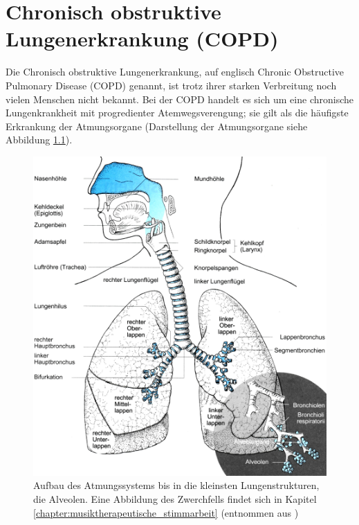\ifpdf
\graphicspath{{2_chronisch_obstruktive_lungenerkrankung/figures/PNG/}{2_chronisch_obstruktive_lungenerkrankung/figures/PDF/}{2_chronisch_obstruktive_lungenerkrankung/figures/}}
\else
\graphicspath{{2_chronisch_obstruktive_lungenerkrankung/figures/EPS/}{2_chronisch_obstruktive_lungenerkrankung/figures/}}
\fi

\chapter{Chronisch obstruktive Lungenerkrankung (COPD)}
\label{chapter:copd}

Die Chronisch obstruktive Lungenerkrankung, auf englisch Chronic Obstructive Pulmonary Disease (COPD) genannt, ist trotz ihrer starken Verbreitung noch vielen Menschen nicht bekannt.
Bei der COPD handelt es sich um eine chronische Lungenkrankheit mit progredienter Atemwegsverengung; sie gilt als die häufigste Erkrankung der Atmungsorgane (Darstellung der Atmungsorgane siehe Abbildung \ref{fig:atemsystem}). 


\begin{figure}
 \centering
  \includegraphics[width=1.0\textwidth]{atemsystem}
  \caption{Aufbau des Atmungssystems bis in die kleinsten Lungenstrukturen, die Alveolen. Eine Abbildung des Zwerchfells findet sich in Kapitel \ref{chapter:musiktherapeutische_stimmarbeit} (entnommen aus \cite[178]{schoppmeyer2012})}
  \label{fig:atemsystem}
\end{figure}

